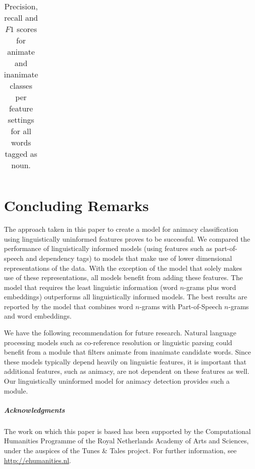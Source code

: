 \documentclass[a4paper,UKenglish]{oasics}
\begin{document}
\begin{table}
\begin{tabular}{llrrrr}
\bottomrule
\end{tabular}
\caption{Precision, recall and $F1$ scores for animate and inanimate classes
  per feature settings for all words tagged as noun.}
\label{tab:results-noun}
\end{table}


\section{Concluding Remarks}

The approach taken in this paper to create a model for animacy
classification using linguistically uninformed features proves to be
successful. We compared the performance of linguistically informed
models (using features such as part-of-speech and dependency tags) to
models that make use of lower dimensional representations of the
data. With the exception of the model that solely makes use of these
representations, all models benefit from adding these features. The
model that requires the least linguistic information (word $n$-grams
plus word embeddings) outperforms all linguistically informed
models. The best results are reported by the model that combines word
$n$-grams with Part-of-Speech $n$-grams and word embeddings.

We have the following recommendation for future research. Natural
language processing models such as co-reference resolution or
linguistic parsing could benefit from a module that filters animate
from inanimate candidate words. Since these models typically depend
heavily on linguistic features, it is important that additional
features, such as animacy, are not dependent on these features as
well. Our linguistically uninformed model for animacy detection
provides such a module.



\subparagraph*{Acknowledgments}

The work on which this paper is based has been supported by the
Computational Humanities Programme of the Royal Netherlands Academy of
Arts and Sciences, under the auspices of the Tunes \& Tales
project. For further information, see \url{http://ehumanities.nl}.


\end{document}
